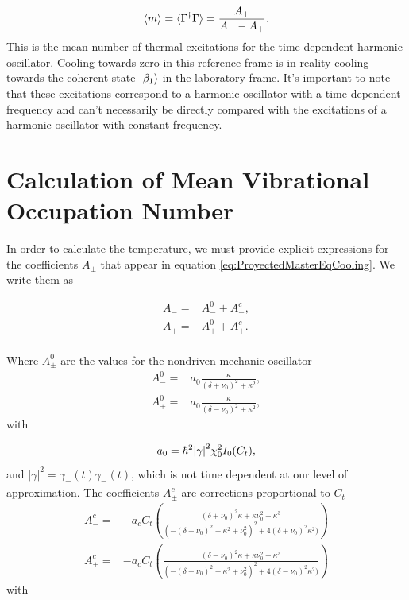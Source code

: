 \documentclass[reprint, amsmath,amssymb, aps,pra]{revtex4-1}
\begin{document}
\begin{equation}\label{eq:TempExpression}
\expval{m} =\langle \Gamma^\dagger \Gamma \rangle = \frac{A_+}{A_- - A_+}.
\end{equation}
This is the mean number of thermal excitations for the time-dependent harmonic
oscillator. Cooling towards zero in this reference frame is in
reality cooling towards the coherent state $\ket{\beta_1}$ in the
laboratory frame. It's important to note that these excitations
correspond to a harmonic oscillator with a time-dependent frequency
and can't necessarily be directly compared with the excitations of a
harmonic oscillator with constant frequency.


\section{Calculation of Mean Vibrational Occupation Number}\label{NumCal}

In order to calculate the temperature, we must provide explicit
expressions for the coefficients $A_\pm$ that appear in equation
\eqref{eq:ProyectedMasterEqCooling}. We write them as 

\begin{align}
A_- =& A_-^0 + A_-^c,\\
A_+ =& A_+^0 + A_+^c.\\
\end{align}

Where $A_\pm^0$ are the values for the nondriven mechanic oscillator
\citep{LCNooshi}
\begin{align}
A_-^0 =& a_0\frac{\kappa}{(\delta+\nu_0)^2+\kappa^2},\\
A_+^0 =& a_0\frac{\kappa}{(\delta-\nu_0)^2+\kappa^2},
\end{align} with 

\begin{equation}
a_0 = \hbar^2\abs{\gamma}^2\chi_0^2 I_0(C_t),
\end{equation}
and $|\gamma|^2 = \gamma_+(t) \gamma_-(t)$, which is not time
dependent at our level of approximation. The coefficients $A_\pm^c$  are corrections proportional to $C_t$
\begin{align}
A_-^c=& -a_cC_t(\frac{(\delta+\nu_0)^2\kappa+ \kappa\nu_0^2 + \kappa^3}{(-(\delta+\nu_0)^2+\kappa^2+\nu_0^2)^2+4(\delta+\nu_0)^2\kappa^2)})\\
A_+^c=& -a_cC_t(\frac{(\delta-\nu_0)^2\kappa+ \kappa\nu_0^2 + \kappa^3}{(-(\delta-\nu_0)^2+\kappa^2+\nu_0^2)^2+4(\delta-\nu_0)^2\kappa^2)})
\end{align} with
\end{document}
